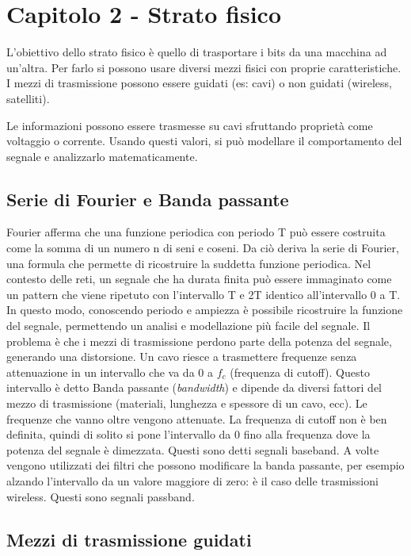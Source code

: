 \newpage
\section{Capitolo 2 - Strato fisico}

L'obiettivo dello strato fisico è quello di trasportare i bits da una macchina ad un'altra.
Per farlo si possono usare diversi mezzi fisici con proprie caratteristiche.
I mezzi di trasmissione possono essere guidati (es: cavi) o non guidati (wireless, satelliti).

Le informazioni possono essere trasmesse su cavi sfruttando proprietà come voltaggio o corrente. 
Usando questi valori, si può modellare il comportamento del segnale e analizzarlo matematicamente.

\subsection{Serie di Fourier e Banda passante}

Fourier afferma che una funzione periodica con periodo T può essere costruita come la somma di un numero n di seni e coseni.
Da ciò deriva la serie di Fourier, una formula che permette di ricostruire la suddetta funzione periodica. 
Nel contesto delle reti, un segnale che ha durata finita può essere immaginato come un pattern che viene ripetuto con l'intervallo T e 2T identico all'intervallo 0 a T.
In questo modo, conoscendo periodo e ampiezza è possibile ricostruire la funzione del segnale, permettendo un analisi e modellazione più facile del segnale.
Il problema è che i mezzi di trasmissione perdono parte della potenza del segnale, generando una distorsione.
Un cavo riesce a trasmettere frequenze senza attenuazione in un intervallo che va da 0 a $f_c$ (frequenza di cutoff).
Questo intervallo è detto Banda passante (\textit{bandwidth}) e dipende da diversi fattori del mezzo di trasmissione (materiali, lunghezza e spessore di un cavo, ecc).
Le frequenze che vanno oltre vengono attenuate.
La frequenza di cutoff non è ben definita, quindi di solito si pone l'intervallo da 0 fino alla frequenza dove la potenza del segnale è dimezzata.
Questi sono detti segnali baseband.
A volte vengono utilizzati dei filtri che possono modificare la banda passante, per esempio alzando l'intervallo da un valore maggiore di zero: è il caso delle trasmissioni wireless.
Questi sono segnali passband.

\subsection{Mezzi di trasmissione guidati}

